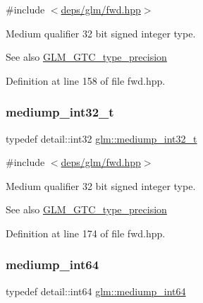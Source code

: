 {\ttfamily \#include $<$\hyperlink{fwd_8hpp}{deps/glm/fwd.\+hpp}$>$}

Medium qualifier 32 bit signed integer type. \begin{DoxySeeAlso}{See also}
\hyperlink{group__gtc__type__precision}{G\+L\+M\+\_\+\+G\+T\+C\+\_\+type\+\_\+precision} 
\end{DoxySeeAlso}


Definition at line 158 of file fwd.\+hpp.

\mbox{\label{group__gtc__type__precision_gafd9b4bd9e4465aec63351b59100692c4}} 
\subsubsection{\texorpdfstring{mediump\+\_\+int32\+\_\+t}{mediump\_int32\_t}}
{\footnotesize\ttfamily typedef detail\+::int32 \hyperlink{group__gtc__type__precision_gafd9b4bd9e4465aec63351b59100692c4}{glm\+::mediump\+\_\+int32\+\_\+t}}



{\ttfamily \#include $<$\hyperlink{fwd_8hpp}{deps/glm/fwd.\+hpp}$>$}

Medium qualifier 32 bit signed integer type. \begin{DoxySeeAlso}{See also}
\hyperlink{group__gtc__type__precision}{G\+L\+M\+\_\+\+G\+T\+C\+\_\+type\+\_\+precision} 
\end{DoxySeeAlso}


Definition at line 174 of file fwd.\+hpp.

\mbox{\label{group__gtc__type__precision_ga603c695fe5cd677d3f72a81343e19a74}} 
\subsubsection{\texorpdfstring{mediump\+\_\+int64}{mediump\_int64}}
{\footnotesize\ttfamily typedef detail\+::int64 \hyperlink{group__gtc__type__precision_ga603c695fe5cd677d3f72a81343e19a74}{glm\+::mediump\+\_\+int64}}



